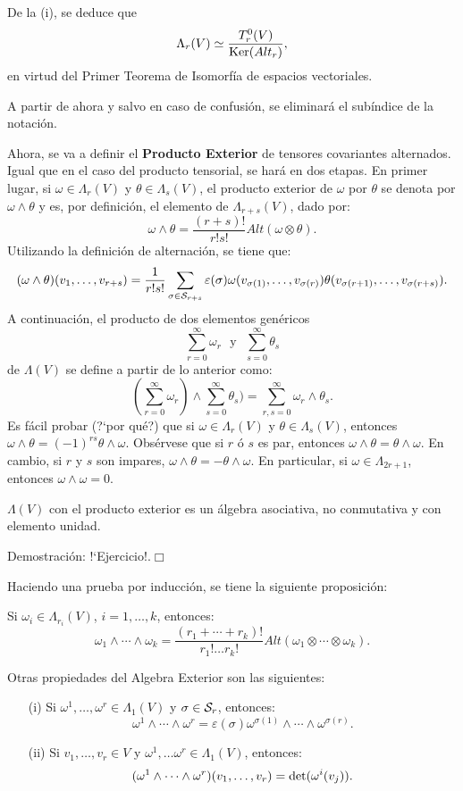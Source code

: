 \documentclass[cursovd_portada.tex]{subfiles}
\begin{document}
\par\bigskip
De la (i), se deduce que
$$\Lambda_r(V)\simeq\frac{T^0_r(V)}{{\rm Ker}(Alt_r)},$$
en virtud del Primer Teorema de Isomorfía de espacios vectoriales.
\par
A partir de ahora y salvo en caso de confusión, se eliminará el subíndice de la notación.
\par
Ahora, se va a definir el {\bf Producto Exterior} de tensores covariantes alternados. Igual que en el caso del
producto tensorial, se hará en dos etapas. En primer lugar, si $\omega\in\Lambda_r(V)$ y $\theta\in\Lambda_s(V)$,
el producto exterior de $\omega$ por $\theta$ se denota por $\omega\wedge \theta$ y es, por definición, el
elemento de $\Lambda_{r+s}(V)$, dado por:
$$\omega\wedge\theta=\frac{(r+s)!}{r!s!}Alt(\omega\otimes\theta).$$
\hs Utilizando la definición de alternación, se tiene que:
$$(\omega\wedge\theta )(v_1,\dots ,v_{r+s})=\frac{1}{r!s!}\sum_{\sigma\in{\cal
S}_{r+s}}\varepsilon(\sigma)\omega(v_{\sigma (1)},\dots ,v_{\sigma (r)})\theta(v_ {\sigma (r+1)},\dots ,v_{\sigma
(r+s)}).$$ \hs A continuación, el producto de dos elementos genéricos
$$\sum_{r=0}^{\infty}\omega_r\mbox{ }\mbox{y}\mbox{ }\sum_{s=0}^{\infty}\theta_s$$
de $\Lambda (V)$ se define a partir de lo anterior como:
$$\left(\sum_{r=0}^{\infty}\omega_r\right)\wedge \sum_{s=0}^{\infty}\theta_s)=\sum_
{r,s=0}^{\infty}\omega_r\wedge\theta _s.$$ \hs Es fácil probar (?`por qué?) que si $\omega\in\Lambda_r(V)$ y
$\theta\in\Lambda _s(V)$, entonces $\omega\wedge\theta=(-1)^{rs}\theta\wedge\omega$. Obsérvese que si $r$ ó $s$ es
par, entonces $\omega\wedge\theta=\theta\wedge\omega$. En cambio, si $r$ y $s$ son impares,
$\omega\wedge\theta=-\theta\wedge\omega$. En particular, si $\omega\in\Lambda_{2r+1}$, entonces
$\omega\wedge\omega=0$.
\begin{propoap}
$\Lambda (V)$ con el producto exterior es un álgebra asociativa, no conmutativa y con elemento unidad.
\end{propoap}
{\sc Demostración:} !`Ejercicio!.\hfill$\Box$
\par\bigskip
Haciendo una prueba por inducción, se tiene la siguiente proposición:
\begin{propoap}
Si $\omega_i\in\Lambda_{r_i}(V)$, $i=1,\dots ,k$, entonces:
$$\omega_1\wedge\cdots\wedge\omega_k=\frac{(r_1+\cdots +r_k)!}{r_1!\dots r_k!}
Alt(\omega_1\otimes\cdots\otimes\omega _k).$$
\end{propoap}
\par\bigskip
Otras propiedades del Algebra Exterior son las siguientes:
\begin{propoap}
\begin{enumerate}
\item[(i)] Si $\omega ^1,\dots ,\omega^r\in\Lambda_1(V)$ y $\sigma\in{\cal S}
_r$, entonces:
$$\omega^1\wedge\cdots\wedge\omega^r=\varepsilon(\sigma)\omega^{
\sigma(1)}\wedge\cdots\wedge\omega^{\sigma(r)}.$$
\item[(ii)] Si $v_1,\dots ,v_r\in V$ y $\omega^1,\dots\omega^r\in
\Lambda_1(V)$, entonces:
$$(\omega^1\wedge\cdots\wedge\omega^r)(v_1,\dots ,v_r)={\rm det}(\omega^i(v_j))
.$$
\end{enumerate}
\end{propoap}
\end{document}
